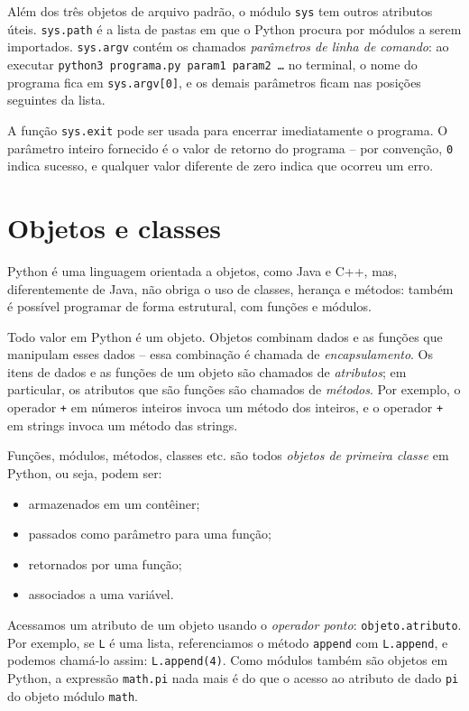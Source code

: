 \documentclass[11pt,a4paper]{article}
\begin{document}
Além dos três objetos de arquivo padrão, o módulo \texttt{sys} tem outros
atributos úteis. \texttt{sys.path} é a lista de pastas em que o Python
procura por módulos a serem importados. \texttt{sys.argv} contém os
chamados \emph{parâmetros de linha de comando}: ao executar
\texttt{python3 programa.py param1 param2 \dots} no terminal, o nome do
programa fica em \texttt{sys.argv[0]}, e os demais parâmetros ficam nas
posições seguintes da lista.

A função \texttt{sys.exit} pode ser usada para encerrar imediatamente o
programa. O parâmetro inteiro fornecido é o valor de retorno do programa
-- por convenção, \texttt{0} indica sucesso, e qualquer valor diferente
de zero indica que ocorreu um erro.

\section{Objetos e classes}

Python é uma linguagem orientada a objetos, como Java e C++, mas,
diferentemente de Java, não obriga o uso de classes, herança e métodos:
também é possível programar de forma estrutural, com funções e módulos.

Todo valor em Python é um objeto. Objetos combinam dados e as funções que
manipulam esses dados -- essa combinação é chamada de
\emph{encapsulamento}. Os itens de dados e as funções de um objeto são
chamados de \emph{atributos}; em particular, os atributos que são funções
são chamados de \emph{métodos}. Por exemplo, o operador \texttt{+} em
números inteiros invoca um método dos inteiros, e o operador \texttt{+}
em strings invoca um método das strings.

Funções, módulos, métodos, classes etc. são todos \emph{objetos de
primeira classe} em Python, ou seja, podem ser:

\begin{itemize}
\item armazenados em um contêiner;
\item passados como parâmetro para uma função;
\item retornados por uma função;
\item associados a uma variável.
\end{itemize}

Acessamos um atributo de um objeto usando o \emph{operador ponto}:
\texttt{objeto.atributo}. Por exemplo, se \texttt{L} é uma lista,
referenciamos o método \texttt{append} com \texttt{L.append}, e podemos
chamá-lo assim: \texttt{L.append(4)}. Como módulos também são objetos em
Python, a expressão \texttt{math.pi} nada mais é do que o acesso ao
atributo de dado \texttt{pi} do objeto módulo \texttt{math}.
\end{document}
